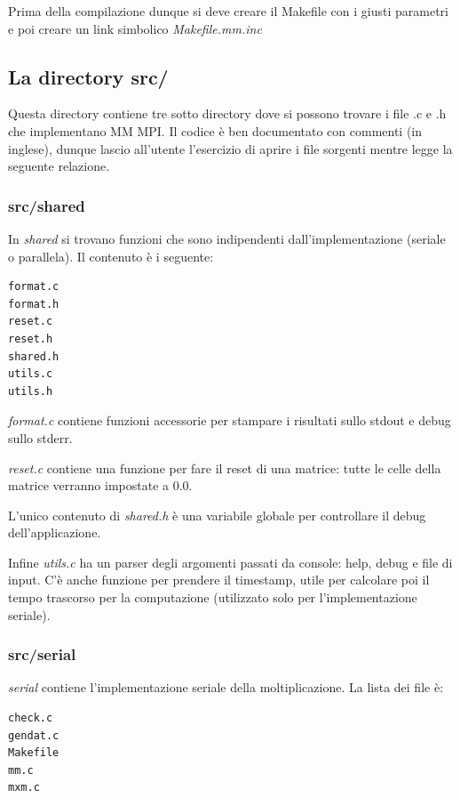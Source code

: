 

Prima della compilazione dunque si deve creare il Makefile con i giusti parametri e poi creare un link simbolico \textit{Makefile.mm.inc}

\subsection{La directory src/}
Questa directory contiene tre sotto directory dove si possono trovare i file .c e .h che implementano MM MPI. Il codice \`{e} ben documentato con commenti (in inglese), dunque lascio all'utente l'esercizio di aprire i file sorgenti mentre legge la seguente relazione.

\subsubsection{src/shared}
In \textit{shared} si trovano funzioni che sono indipendenti dall'implementazione (seriale o parallela). Il contenuto \`{e} i seguente:

\begin{lstlisting}
format.c
format.h
reset.c
reset.h
shared.h
utils.c
utils.h
\end{lstlisting}

\textit{format.c} contiene funzioni accessorie per stampare i risultati sullo stdout e debug sullo stderr.

\textit{reset.c} contiene una funzione per fare il reset di una matrice: tutte le celle della matrice verranno impostate a 0.0.

L'unico contenuto di \textit{shared.h} \`{e} una variabile globale per controllare il debug dell'applicazione.

Infine \textit{utils.c} ha un parser degli argomenti passati da console: help, debug e file di input. C'\`{e} anche funzione per prendere il timestamp, utile per calcolare poi il tempo trascorso per la computazione (utilizzato solo per l'implementazione seriale).

\subsubsection{src/serial}
\textit{serial} contiene l'implementazione seriale della moltiplicazione. La lista dei file \`{e}:

\begin{lstlisting}
check.c
gendat.c
Makefile
mm.c
mxm.c
\end{lstlisting}

